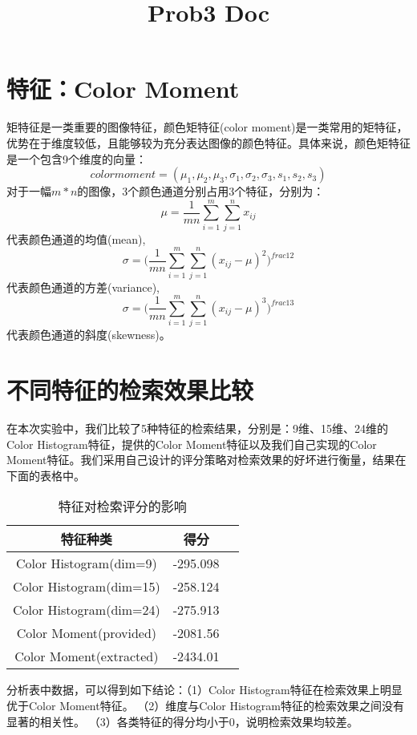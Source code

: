 \documentclass[12pt]{article}
\title{Prob3 Doc}
\begin{document}
  \maketitle
  \section*{特征：Color Moment}
  	矩特征是一类重要的图像特征，颜色矩特征(color moment)是一类常用的矩特征，优势在于维度较低，且能够较为充分表达图像的颜色特征。具体来说，颜色矩特征是一个包含9个维度的向量：
    \begin{equation*}
    color moment = (\mu_1,\mu_2,\mu_3,\sigma_1,\sigma_2,\sigma_3,s_1,s_2,s_3)
    \end{equation*}
    对于一幅$m*n$的图像，3个颜色通道分别占用3个特征，分别为：
    \begin{equation*}
    \mu=\frac{1}{mn}\sum_{i=1}^{m}\sum_{j=1}^{n}x_{ij}
    \end{equation*}
    代表颜色通道的均值(mean),
    \begin{equation*}
    \sigma=\big(\frac{1}{mn}\sum_{i=1}^{m}\sum_{j=1}^{n}(x_{ij}-\mu)^2\big)^{frac{1}{2}}
    \end{equation*}
    代表颜色通道的方差(variance),
    \begin{equation*}
    \sigma=\big(\frac{1}{mn}\sum_{i=1}^{m}\sum_{j=1}^{n}(x_{ij}-\mu)^3\big)^{frac{1}{3}}
    \end{equation*}
    代表颜色通道的斜度(skewness)。
  \section*{不同特征的检索效果比较}
    在本次实验中，我们比较了5种特征的检索结果，分别是：9维、15维、24维的Color Histogram特征，提供的Color Moment特征以及我们自己实现的Color Moment特征。我们采用自己设计的评分策略对检索效果的好坏进行衡量，结果在下面的表格中。
    \begin{table} \caption {特征对检索评分的影响} \centering
       \begin{tabular}{ccc}
        \toprule  %
        特征种类& 得分\\
        \midrule  %
        Color Histogram(dim=9) & -295.098 \\
        Color Histogram(dim=15) & -258.124\\
        Color Histogram(dim=24) & -275.913\\
        Color Moment(provided) & -2081.56\\
        Color Moment(extracted) & -2434.01\\
        \bottomrule %
        \end{tabular}
    \end{table}
    分析表中数据，可以得到如下结论：（1）Color Histogram特征在检索效果上明显优于Color Moment特征。 （2）维度与Color Histogram特征的检索效果之间没有显著的相关性。 （3）各类特征的得分均小于0，说明检索效果均较差。
\end{document}
